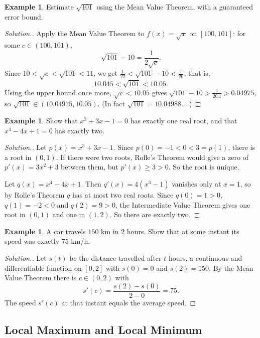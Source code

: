 \documentclass[11pt,a4paper]{article}
\numberwithin{equation}{section}
\theoremstyle{definition}
\newtheorem{exa}[thm]{Example}
\newenvironment{solution}
  {\renewcommand{\qedsymbol}{}\begin{proof}[\textit{Solution}.]}
  {\end{proof}}
\begin{document}
\begin{exa}
Estimate $\sqrt{101}$ using the Mean Value Theorem, with a guaranteed error bound.
\end{exa}

\begin{solution}
Apply the Mean Value Theorem to $f(x) = \sqrt{x}$ on $[100,101]$: for some $c\in(100,101)$,
$$\sqrt{101} - 10 = \frac{1}{2\sqrt{c}} .$$
Since $10<\sqrt{c}<\sqrt{101}<11$, we get $\frac{1}{22}<\sqrt{101} - 10<\frac{1}{20}$, that is,
$$10.045 < \sqrt{101} < 10.05 .$$
Using the upper bound once more, $\sqrt{c}<10.05$ gives $\sqrt{101} - 10 > \frac{1}{20.1}>0.04975$, so $\sqrt{101}\in(10.04975, 10.05)$. (In fact $\sqrt{101} = 10.04988\ldots$.)
\end{solution}

\begin{exa}
Show that $x^3 + 3x - 1 = 0$ has exactly one real root, and that $x^4 - 4x + 1 = 0$ has exactly two.
\end{exa}

\begin{solution}
Let $p(x) = x^3+3x-1$. Since $p(0) = -1<0<3 = p(1)$, there is a root in $(0,1)$. If there were two roots, Rolle's Theorem would give a zero of $p'(x) = 3x^2+3$ between them, but $p'(x)\geq3>0$. So the root is unique.

Let $q(x) = x^4 - 4x + 1$. Then $q'(x) = 4(x^3-1)$ vanishes only at $x = 1$, so by Rolle's Theorem $q$ has at most two real roots. Since $q(0) = 1>0$, $q(1) = -2<0$ and $q(2) = 9>0$, the Intermediate Value Theorem gives one root in $(0,1)$ and one in $(1,2)$. So there are exactly two.
\end{solution}

\begin{exa}
A car travels $150$ km in $2$ hours. Show that at some instant its speed was exactly $75$ km/h.
\end{exa}

\begin{solution}
Let $s(t)$ be the distance travelled after $t$ hours, a continuous and differentiable function on $[0,2]$ with $s(0) = 0$ and $s(2) = 150$. By the Mean Value Theorem there is $c\in(0,2)$ with
$$s'(c) = \frac{s(2) - s(0)}{2 - 0} = 75 .$$
The speed $s'(c)$ at that instant equals the average speed.
\end{solution}


\subsection{Local Maximum and Local Minimum}
\end{document}

